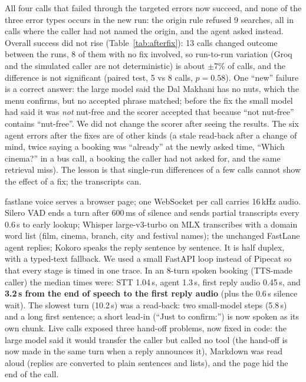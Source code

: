 \documentclass[11pt,a4paper]{article}
\makeatletter
\renewcommand\subsection{\@startsection{subsection}{2}{\z@}{-1.8ex plus -0.5ex minus -0.2ex}{0.8ex plus 0.2ex}{\normalsize\bfseries\raggedright}}
\newcommand{\cmd}[1]{{\small\ttfamily\def\_{\textunderscore\allowbreak}#1}}  %
\makeatother
\begin{document}
All four calls that failed through the targeted errors now succeed, and none of the three error types occurs in the
new run: the origin rule refused 9 searches, all in calls where the caller had not named the origin, and the agent
asked instead. Overall success did not rise (Table~\ref{tab:afterfix}): 13 calls changed outcome between the runs,
8 of them with no fix involved, so run-to-run variation (Groq and the simulated caller are not deterministic) is
about $\pm$7\% of calls, and the difference is not significant (paired test, 5 vs 8 calls, $p=0.58$). One ``new''
failure is a correct answer: the large model said the Dal Makhani has no nuts, which the menu confirms, but no accepted
phrase matched; before the fix the small model had said it was \emph{not} nut-free and the scorer accepted that
because ``not nut-free'' contains ``nut-free''. We did not change the scorer after seeing the results. The six agent
errors after the fixes are of other kinds (a stale read-back after a change of mind, twice saying a booking was
``already'' at the newly asked time, ``Which cinema?'' in a bus call, a booking the caller had not asked for, and the
same retrieval miss). The lesson is that single-run differences of a few calls cannot show the effect of a fix; the
transcripts can.

\subsection{Voice pipeline}
\cmd{fastlane voice} serves a browser page; one WebSocket per call carries 16\,kHz audio. Silero VAD ends a turn after
600\,ms of silence and sends partial transcripts every 0.6\,s to early lookup; Whisper large-v3-turbo on MLX
transcribes with a domain word list (film, cinema, branch, city and festival names); the unchanged FastLane agent
replies; Kokoro speaks the reply sentence by sentence. It is half duplex, with a typed-text fallback. We used a small
FastAPI loop instead of Pipecat so that every stage is timed in one trace. In an 8-turn spoken booking (TTS-made
caller) the median times were: STT 1.04\,s, agent 1.3\,s, first reply audio 0.45\,s, and \textbf{3.2\,s from the end
of speech to the first reply audio} (plus the 0.6\,s silence wait). The slowest turn (10.2\,s) was a read-back: two
small-model steps (5.8\,s) and a long first sentence; a short lead-in (``Just to confirm:'') is now spoken as its own
chunk. Live calls exposed three hand-off problems, now fixed in code: the large model said it would transfer the
caller but called no tool (the hand-off is now made in the same turn when a reply announces it), Markdown was read
aloud (replies are converted to plain sentences and lists), and the page hid the end of the call.
\end{document}
